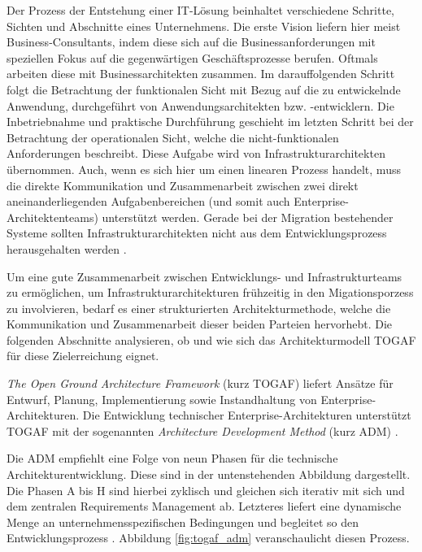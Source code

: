Der Prozess der Entstehung einer IT-Lösung beinhaltet verschiedene Schritte, Sichten und Abschnitte eines Unternehmens. Die erste Vision liefern hier meist Business-Consultants, indem diese sich auf die Businessanforderungen mit speziellen Fokus auf die gegenwärtigen Geschäftsprozesse berufen. Oftmals arbeiten diese mit Businessarchitekten zusammen. Im darauffolgenden Schritt folgt die Betrachtung der funktionalen Sicht mit Bezug auf die zu entwickelnde Anwendung, durchgeführt von Anwendungsarchitekten bzw. -entwicklern. Die Inbetriebnahme und praktische Durchführung geschieht im letzten Schritt bei der Betrachtung der operationalen Sicht, welche die nicht-funktionalen Anforderungen beschreibt. Diese Aufgabe wird von Infrastrukturarchitekten übernommen. Auch, wenn es sich hier um einen linearen Prozess handelt, muss die direkte Kommunikation und Zusammenarbeit zwischen zwei direkt aneinanderliegenden Aufgabenbereichen (und somit auch Enterprise-Architektenteams) unterstützt werden. Gerade bei der Migration bestehender Systeme sollten Infrastrukturarchitekten nicht aus dem Entwicklungsprozess herausgehalten werden \cite{Skript}.

Um eine gute Zusammenarbeit zwischen Entwicklungs- und Infrastrukturteams zu ermöglichen, um Infrastrukturarchitekturen frühzeitig in den Migationsporzess zu involvieren, bedarf es einer strukturierten Architekturmethode, welche die Kommunikation und Zusammenarbeit dieser beiden Parteien hervorhebt. Die folgenden Abschnitte analysieren, ob und wie sich das Architekturmodell TOGAF für diese Zielerreichung eignet.

\textit{The Open Ground Architecture Framework} (kurz TOGAF) liefert Ansätze für Entwurf, Planung, Implementierung sowie Instandhaltung von Enterprise-Architekturen. Die Entwicklung technischer Enterprise-Architekturen unterstützt TOGAF mit der sogenannten \textit{Architecture Development Method} (kurz ADM) \cite{TOGAFDocs}\cite{Matthes}\cite{VisualParadigmTOGAF}.

Die ADM empfiehlt eine Folge von neun Phasen für die technische Architekturentwicklung. Diese sind in der untenstehenden Abbildung dargestellt. Die Phasen A bis H sind hierbei zyklisch und gleichen sich iterativ mit sich und dem zentralen Requirements Management ab. Letzteres liefert eine dynamische Menge an unternehmensspezifischen Bedingungen und begleitet so den Entwicklungsprozess \cite{TOGAFDocs}. Abbildung \ref{fig:togaf_adm} veranschaulicht diesen Prozess.

